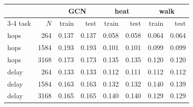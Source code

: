 \begin{tabular}{@{}lrrrrrrr@{}}
\toprule
& & \multicolumn{2}{c}{GCN} & \multicolumn{2}{c}{heat} & \multicolumn{2}{c}{walk} \\
\cmidrule{3-4}\cmidrule{5-6}\cmidrule{7-8}
task & $N$ & train & test & train & test & train & test \\
\midrule
hops & 264 & 0.137 & 0.137 & 0.058 & 0.058 & 0.064 & 0.064 \\
hops & 1584 & 0.193 & 0.193 & 0.101 & 0.101 & 0.099 & 0.099 \\
hops & 3168 & 0.173 & 0.173 & 0.135 & 0.135 & 0.120 & 0.120 \\
delay & 264 & 0.133 & 0.133 & 0.112 & 0.111 & 0.112 & 0.112 \\
delay & 1584 & 0.163 & 0.163 & 0.132 & 0.132 & 0.140 & 0.139 \\
delay & 3168 & 0.165 & 0.165 & 0.140 & 0.140 & 0.129 & 0.129 \\
\bottomrule
\end{tabular}
